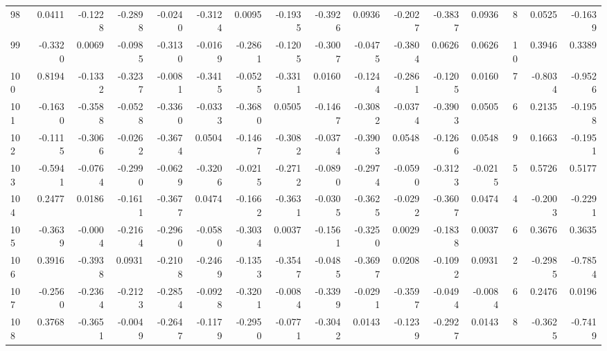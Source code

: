 \begin{tabular}{lrrrrrrrrrrrrrrr}
98  &      0.0411 & -0.1228 & -0.2898 & -0.0240 & -0.3124 &  0.0095 & -0.1935 & -0.3926 &  0.0936 & -0.2027 &  -0.3837 &     0.0936 &      8 &                    0.0525 &                    -0.1639 \\
99  &     -0.3320 &  0.0069 & -0.0985 & -0.3130 & -0.0169 & -0.2861 & -0.1205 & -0.3007 & -0.0475 & -0.3804 &   0.0626 &     0.0626 &     10 &                    0.3946 &                     0.3389 \\
100 &      0.8194 & -0.1332 & -0.3237 & -0.0081 & -0.3415 & -0.0525 & -0.3311 &  0.0160 & -0.1244 & -0.2861 &  -0.1205 &     0.0160 &      7 &                   -0.8034 &                    -0.9526 \\
101 &     -0.1630 & -0.3588 & -0.0528 & -0.3360 & -0.0333 & -0.3680 &  0.0505 & -0.1467 & -0.3082 & -0.0374 &  -0.3903 &     0.0505 &      6 &                    0.2135 &                    -0.1958 \\
102 &     -0.1115 & -0.3066 & -0.0262 & -0.3674 &  0.0504 & -0.1467 & -0.3082 & -0.0374 & -0.3903 &  0.0548 &  -0.1266 &     0.0548 &      9 &                    0.1663 &                    -0.1951 \\
103 &     -0.5941 & -0.0764 & -0.2990 & -0.0629 & -0.3206 & -0.0215 & -0.2712 & -0.0890 & -0.2974 & -0.0590 &  -0.3123 &    -0.0215 &      5 &                    0.5726 &                     0.5177 \\
104 &      0.2477 &  0.0186 & -0.1611 & -0.3677 &  0.0474 & -0.1662 & -0.3631 & -0.0305 & -0.3625 & -0.0292 &  -0.3607 &     0.0474 &      4 &                   -0.2003 &                    -0.2291 \\
105 &     -0.3639 & -0.0004 & -0.2164 & -0.2960 & -0.0580 & -0.3034 &  0.0037 & -0.1561 & -0.3250 &  0.0029 &  -0.1838 &     0.0037 &      6 &                    0.3676 &                     0.3635 \\
106 &      0.3916 & -0.3938 &  0.0931 & -0.2108 & -0.2469 & -0.1353 & -0.3547 & -0.0485 & -0.3697 &  0.0208 &  -0.1092 &     0.0931 &      2 &                   -0.2985 &                    -0.7854 \\
107 &     -0.2560 & -0.2364 & -0.2123 & -0.2854 & -0.0928 & -0.3201 & -0.0084 & -0.3399 & -0.0291 & -0.3597 &  -0.0494 &    -0.0084 &      6 &                    0.2476 &                     0.0196 \\
108 &      0.3768 & -0.3651 & -0.0049 & -0.2647 & -0.1179 & -0.2950 & -0.0771 & -0.3042 &  0.0143 & -0.1239 &  -0.2927 &     0.0143 &      8 &                   -0.3625 &                    -0.7419 \\

\end{tabular}
